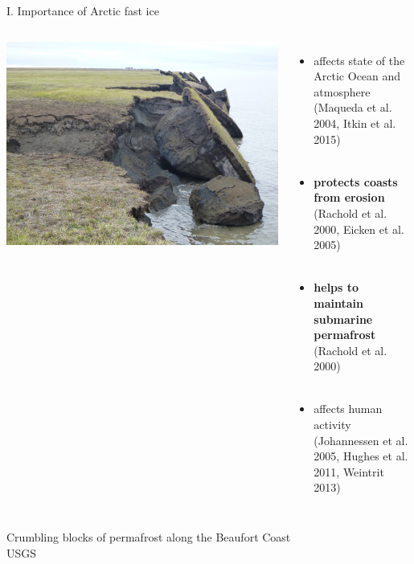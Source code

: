 \documentclass[8pt]{beamer}
\begin{document}
\setwatermark{\fontsize{125pt}{125pt}\selectfont{}}
\begin{frame}[fragile]{I. Importance of Arctic fast ice}
	\begin{columns}
		\includegraphics[width=1\textwidth]{./img/Coastal_erosion_.jpg}\\
		\begin{itemize}
			\item affects state of the Arctic Ocean and atmosphere\\(Maqueda et al. 2004, Itkin et al. 2015)\\~\\ 
			\item \textbf{protects coasts from erosion}\\(Rachold et al. 2000, Eicken et al. 2005)\\~\\ 
			\item \textbf{helps to maintain submarine permafrost}\\ (Rachold et al. 2000)\\~\\
			\item affects human activity\\(Johannessen et al. 2005, Hughes et al. 2011, Weintrit 2013)
		\end{itemize}
	\end{columns}

	Crumbling blocks of permafrost along the Beaufort Coast\\
	USGS
\end{frame}
\end{document}

